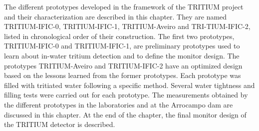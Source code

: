 The different prototypes developed in the framework of the TRITIUM project and their characterization are described in this chapter. They are named TRITIUM-IFIC-0, TRITIUM-IFIC-1, TRITIUM-Aveiro and TRI-TIUM-IFIC-2, listed in chronological order of their construction. The first two prototypes, TRITIUM-IFIC-0 and TRITIUM-IFIC-1, are preliminary prototypes used to learn about in-water tritium detection and to define the monitor design. The prototypes TRITIUM-Aveiro and TRITIUM-IFIC-2 have an optimized design based on the lessons learned from the former prototypes. Each prototype was filled with tritiated water following a specific method. Several water tightness and filling tests were carried out for each prototype. The measurements obtained by the different prototypes in the laboratories and at the Arrocampo dam are discussed in this chapter. At the end of the chapter, the final monitor design of the TRITIUM detector is described.